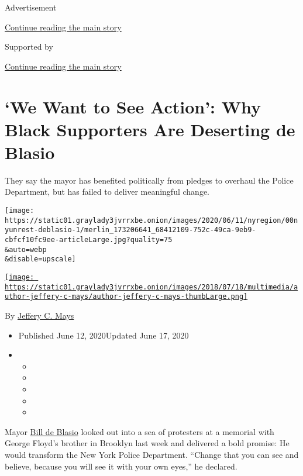Advertisement

\protect\hyperlink{after-top}{Continue reading the main story}

Supported by

\protect\hyperlink{after-sponsor}{Continue reading the main story}

\hypertarget{we-want-to-see-action-why-black-supporters-are-deserting-de-blasio}{%
\section{`We Want to See Action': Why Black Supporters Are Deserting de
Blasio}\label{we-want-to-see-action-why-black-supporters-are-deserting-de-blasio}}

They say the mayor has benefited politically from pledges to overhaul
the Police Department, but has failed to deliver meaningful change.

\texttt{[image: https://static01.graylady3jvrrxbe.onion/images/2020/06/11/nyregion/00nyunrest-deblasio-1/merlin\_173206641\_68412109-752c-49ca-9eb9-cbfcf10fc9ee-articleLarge.jpg?quality=75\\\&auto=webp\\\&disable=upscale]}

\href{https://www.nytimes3xbfgragh.onion/by/jeffery-c-mays}{\texttt{[image: https://static01.graylady3jvrrxbe.onion/images/2018/07/18/multimedia/author-jeffery-c-mays/author-jeffery-c-mays-thumbLarge.png]}}

By \href{https://www.nytimes3xbfgragh.onion/by/jeffery-c-mays}{Jeffery
C. Mays}

\begin{itemize}
\item
  Published June 12, 2020Updated June 17, 2020
\item
  \begin{itemize}
  \item
  \item
  \item
  \item
  \item
  \end{itemize}
\end{itemize}

Mayor
\href{https://www.nytimes3xbfgragh.onion/2020/06/17/nyregion/police-reform-nypd.html}{Bill
de Blasio} looked out into a sea of protesters at a memorial with George
Floyd's brother in Brooklyn last week and delivered a bold promise: He
would transform the New York Police Department. ``Change that you can
see and believe, because you will see it with your own eyes,'' he
declared.

